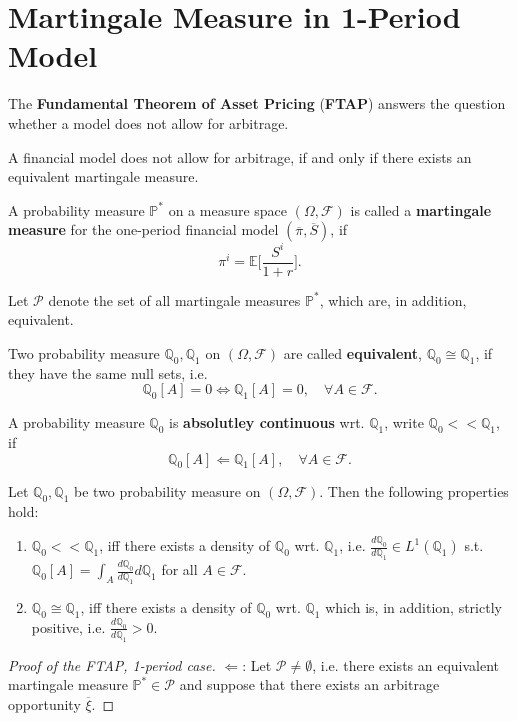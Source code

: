 \section{Martingale Measure in 1-Period Model}

\begin{rem}
The \textbf{Fundamental Theorem of Asset Pricing} (\textbf{FTAP}) answers the question whether a model does not allow for arbitrage.
\end{rem}

\begin{ftheo}[FTAP]
A financial model does not allow for arbitrage, if and only if there exists an equivalent martingale measure.
\end{ftheo}

\begin{defi}
A probability measure $\mathbb P^*$ on a measure space $(\Omega, \mathcal F)$ is called a \textbf{martingale measure} for the one-period financial model $(\overline \pi, \overline S)$, if
$$\pi^i = \mathbb E\Bigg[\frac{S^i}{1+r}\Bigg].$$
\end{defi}

\begin{nota}
Let $\mathcal P$ denote the set of all martingale measures $\mathbb P^*$, which are, in addition, equivalent.
\end{nota}

\begin{defi}
Two probability measure $\mathbb Q_0,\mathbb Q_1$ on $(\Omega, \mathcal F)$ are called \textbf{equivalent}, $\mathbb Q_0\cong \mathbb Q_1$, if they have the same null sets, i.e.
$$\mathbb Q_0[A]=0 \Longleftrightarrow \mathbb Q_1[A]= 0,\quad \forall A\in\mathcal F.$$
\end{defi}

\begin{defi}
A probability measure $\mathbb Q_0$ is \textbf{absolutley continuous} wrt. $\mathbb Q_1$, write $\mathbb Q_0<< \mathbb Q_1$, if 
$$\mathbb Q_0[A] \Leftarrow \mathbb Q_1[A],\quad \forall A\in\mathcal F.$$
\end{defi}

\begin{remin}
Let $\mathbb Q_0,\mathbb Q_1$ be two probability measure on $(\Omega, \mathcal F)$. Then the following properties hold:
\begin{enumerate}
    \item $\mathbb Q_0<<\mathbb Q_1$, iff there exists a density of $\mathbb Q_0$ wrt. $\mathbb Q_1$, i.e. $\frac{d\mathbb Q_0}{d\mathbb Q_1}\in L^1(\mathbb Q_1)$ s.t. $\mathbb Q_0[A] = \int_A\frac{d\mathbb Q_0}{d\mathbb Q_1} d\mathbb Q_1$ for all $A\in\mathcal F$.
    \item $\mathbb Q_0\cong \mathbb Q_1$, iff there exists a density of $\mathbb Q_0$ wrt. $\mathbb Q_1$ which is, in addition, strictly positive, i.e. $\frac{d\mathbb Q_0}{d\mathbb Q_1}>0$. 
\end{enumerate}
\end{remin}

\begin{proof}[Proof of the FTAP, 1-period case]
$\Leftarrow$: Let $\mathcal P\neq \emptyset$, i.e. there exists an equivalent martingale measure $\mathbb P^*\in\mathcal P$ and suppose that there exists an arbitrage opportunity $\overline \xi$. 
\end{proof}

